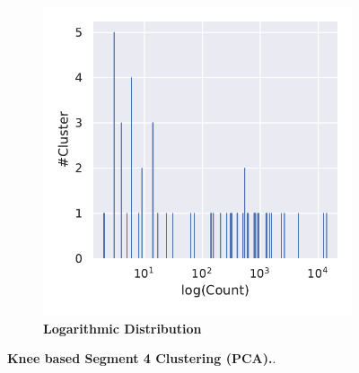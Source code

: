 \begin{figure}[!hbt]
\begin{subfigure}[b]{0.475\textwidth}
    \end{subfigure}
    \hfill
    \begin{subfigure}[b]{0.475\textwidth}
        \caption[Logarithmic Distribution]{\textbf{Logarithmic Distribution}}
        \label{subfig:PCA_Cluster_Knee_Distribution_log_4}            \includegraphics[width=\textwidth]{PCA/Cluster_Distribution_Log_Segment_4.pdf}
    \end{subfigure}
    \caption[Knee based Segment 4 Clustering (\Acrshort{PCA})]{\textbf{Knee based Segment 4 Clustering (\Acrshort{PCA}).}.}
    \label{fig:PCA_Cluster_Knee_4}
\end{figure}

